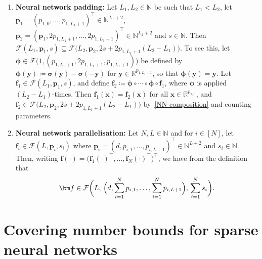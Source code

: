 \documentclass[12pt]{article}
\begin{document}
\begin{enumerate}[label=(P\arabic*)]
    \item \label{NN-padding} \textbf{Neural network padding:} Let $L_1,L_2 \in \mathbb{N}$ be such that $L_1 < L_2$, let $\bm p_1 = (p_{1,0},\ldots,p_{1,L_1+1})^\top \in \mathbb{N}^{L_1+2}$, $\bm p_2 = (\bm p_1, 2p_{1,L_1+1},\ldots, 2p_{1,L_1+1})^\top \in \mathbb{N}^{L_2+2}$ and $s\in\mathbb{N}$. Then $\mathcal{F}(L_1, \bm p_1, s) \subseteq \mathcal{F}\bigl(L_2, \bm p_2, 2s+2p_{1,L_1+1}(L_2-L_1)\bigr)$.  To see this, let $\bm \phi \in \mathcal{F}\bigl(1, (p_{1,L_1+1}, 2p_{1,L_1+1}, p_{1,L_1+1})\bigr)$ be defined by $\bm \phi (\bm y) \coloneqq \bm\sigma(\bm y) - \bm\sigma(-\bm y)$ for $\bm y \in \mathbb{R}^{p_{1,L_1+1}}$, so that $\bm\phi(\bm y) = \bm y$. Let $\bm f_1 \in \mathcal{F}(L_1, \bm p_1, s)$, and define $\bm f_2 \coloneqq \bm\phi \circ \cdots\circ \bm\phi \circ \bm f_1$, where $\bm\phi$ is applied $(L_2-L_1)$-times. Then $\bm f_1(\bm x) = \bm f_2(\bm x)$ for all $\bm x \in \mathbb{R}^{p_{1,0}}$, and $\bm f_2 \in \mathcal{F}\bigl(L_2, \bm p_2, 2s + 2p_{1,L_1+1}(L_2-L_1)\bigr)$ by~\ref{NN-composition} and counting parameters.
    
    \item \label{NN-parallelisation} \textbf{Neural network parallelisation:} Let $N, L \in\mathbb{N}$ and for $i\in[N]$, let $\bm f_i \in \mathcal{F}(L,\bm p_i,s_i)$ where $\bm p_i = (d,p_{i,1},\ldots,p_{i,L+1})^\top \in \mathbb{N}^{L+2}$ and $s_i \in \mathbb{N}$. Then, writing $\bm f(\cdot) = \bigl(\bm f_1(\cdot)^\top, \ldots, \bm f_N(\cdot)^\top \bigr)^\top$, we have from the definition that 
    \begin{align*}
        \bm f \in \mathcal{F}\biggl(L,\, \Bigl(d,\sum_{i=1}^N p_{i,1}, \ldots, \sum_{i=1}^N p_{i,L+1}\Bigr),\, \sum_{i=1}^N s_i\biggr).
    \end{align*}
\end{enumerate}


\section{Covering number bounds for sparse neural networks}
\end{document}

